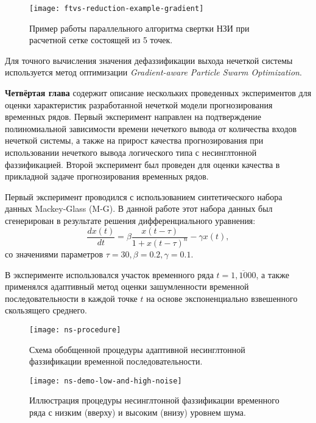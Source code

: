 \begin{figure}[ht]
	\centering
	\texttt{[image: ftvs-reduction-example-gradient]}
	\caption{Пример работы параллельного алгоритма свертки НЗИ при расчетной сетке состоящей из 5 точек.}
	\label{fig:ftvs-reduction-example}
\end{figure}

Для точного вычисления значения дефаззификации выхода нечеткой системы используется метод оптимизации \textit{Gradient-aware Particle Swarm Optimization}.



\textbf{Четвёртая глава} содержит описание нескольких проведенных экспериментов для оценки характеристик разработанной нечеткой модели прогнозирования временных рядов. Первый эксперимент направлен на подтверждение полиномиальной зависимости времени нечеткого вывода от количества входов нечеткой системы, а также на прирост качества прогнозирования при использовании нечеткого вывода логического типа с несинглтонной фаззификацией. Второй эксперимент был проведен для оценки качества в прикладной задаче прогнозирования временных рядов.

Первый эксперимент проводился с использованием синтетического набора данных Mackey-Glass (M-G). В данной работе этот набора данных был сгенерирован в результате решения дифференциального уравнения:
\begin{equation}
	\frac{dx(t)}{dt} = \beta\frac{x(t-\tau)}{1+x(t-\tau)^n}-\gamma x(t)
	\label{eqn:mackey-glass-definition},
\end{equation}
со значениями параметров $\tau = 30, \beta = 0.2, \gamma = 0.1$.

В эксперименте использовался участок временного ряда $t=\overline{1,1000}$, а также применялся адаптивный метод оценки зашумленности временной последовательности в каждой точке $t$ на основе экспоненциально взвешенного скользящего среднего.

\begin{figure}[ht]
	\begin{minipage}[c]{0.49\textwidth}
		\centering
		\texttt{[image: ns-procedure]}
		\caption{Схема обобщенной процедуры адаптивной несинглтонной фаззификации временной последовательности.}
		\label{fig:ns-procedure}
	\end{minipage}
	\hfill
	\begin{minipage}[c]{0.49\textwidth}
		\centering
		\texttt{[image: ns-demo-low-and-high-noise]}
		\caption{Иллюстрация процедуры несинглтонной фаззификации временного ряда с низким (вверху) и высоким (внизу) уровнем шума.}
		\label{fig:ns-demo-low-and-high-noise}
	\end{minipage}
\end{figure}

